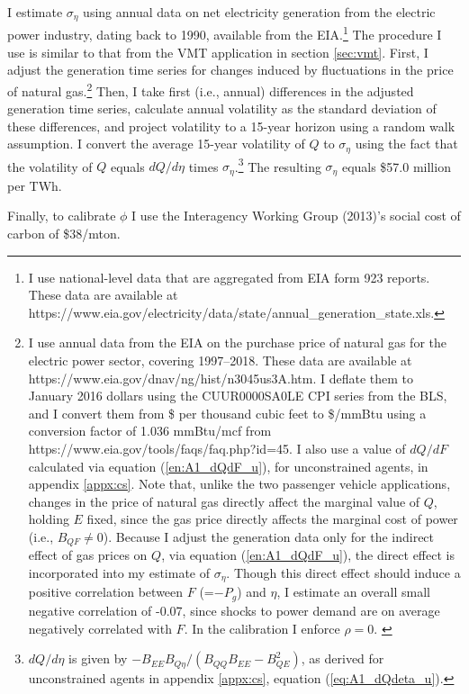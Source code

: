 \documentclass[12pt]{article}
\begin{document}
I estimate $\sigma_\eta$ using annual data on net electricity generation from the electric power industry, dating back to 1990, available from the EIA.\footnote{I use national-level data that are aggregated from EIA form 923 reports. These data are available at https://www.eia.gov/electricity/data/state/annual\_generation\_state.xls.} The procedure I use is similar to that from the VMT application in section \ref{sec:vmt}. First, I adjust the generation time series for changes induced by fluctuations in the price of natural gas.\footnote{I use annual data from the EIA on the purchase price of natural gas for the electric power sector, covering 1997--2018. These data are available at https://www.eia.gov/dnav/ng/hist/n3045us3A.htm. I deflate them to January 2016 dollars using the CUUR0000SA0LE CPI series from the BLS, and I convert them from \$ per thousand cubic feet to \$/mmBtu using a conversion factor of 1.036 mmBtu/mcf from https://www.eia.gov/tools/faqs/faq.php?id=45. I also use a value of $dQ/dF$ calculated via equation (\ref{en:A1_dQdF_u}), for unconstrained agents, in appendix \ref{appx:cs}. Note that, unlike the two passenger vehicle applications, changes in the price of natural gas directly affect the marginal value of $Q$, holding $E$ fixed, since the gas price directly affects the marginal cost of power (i.e., $B_{QF}\neq0$). Because I adjust the generation data only for the indirect effect of gas prices on $Q$, via equation (\ref{en:A1_dQdF_u}), the direct effect is incorporated into my estimate of $\sigma_\eta$. Though this direct effect should induce a positive correlation between $F$ (=$-P_g$) and $\eta$, I estimate an overall small negative correlation of -0.07, since shocks to power demand are on average negatively correlated with $F$. In the calibration I enforce $\rho=0$. \label{fn:retailnatgas}} Then, I take first (i.e., annual) differences in the adjusted generation time series, calculate annual volatility as the standard deviation of these differences, and project volatility to a 15-year horizon using a random walk assumption. I convert the average 15-year volatility of $Q$ to $\sigma_\eta$ using the fact that the volatility of $Q$ equals $dQ/d\eta$ times $\sigma_\eta$.\footnote{$dQ/d\eta$ is given by $-B_{EE}B_{Q\eta}/(B_{QQ}B_{EE}-B_{QE}^2)$, as derived for unconstrained agents in appendix \ref{appx:cs}, equation (\ref{eq:A1_dQdeta_u}).} The resulting $\sigma_\eta$ equals \$57.0 million per TWh.

Finally, to calibrate $\phi$ I use the Interagency Working Group (2013)'s social cost of carbon of \$38/mton. 
\end{document}

